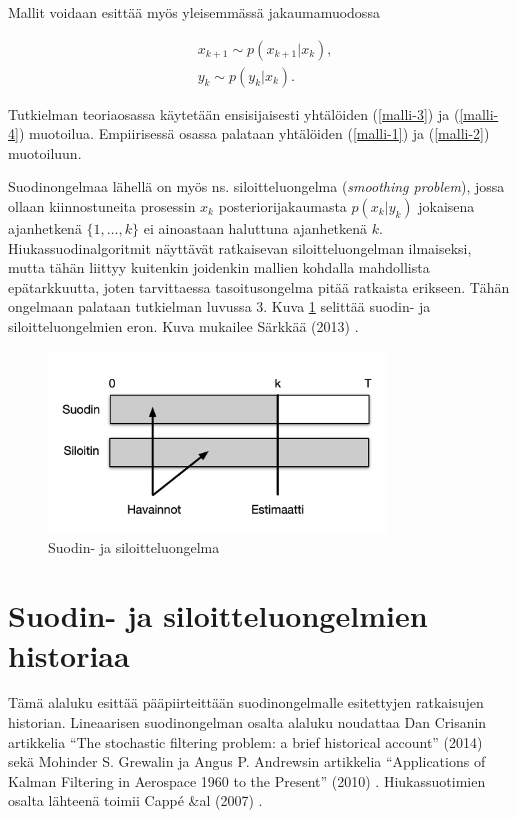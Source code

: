 \documentclass[
  12pt,
  a4paper, twoside]{book}
\begin{document}
Mallit voidaan esittää myös yleisemmässä jakaumamuodossa

\begin{align}
&\label{malli-3} x_{k+1} \sim p(x_{k+1}|x_k),\\
&\label{malli-4} y_{k} \sim p(y_k|x_k).
\end{align}

Tutkielman teoriaosassa käytetään ensisijaisesti yhtälöiden (\ref{malli-3}) ja (\ref{malli-4}) muotoilua. Empiirisessä osassa palataan yhtälöiden (\ref{malli-1}) ja (\ref{malli-2}) muotoiluun.

Suodinongelmaa lähellä on myös ns. siloitteluongelma (\emph{smoothing problem}), jossa ollaan kiinnostuneita prosessin \(x_k\) posteriorijakaumasta \(p(x_k|y_k)\) jokaisena ajanhetkenä \(\{1,\ldots,k\}\) ei ainoastaan haluttuna ajanhetkenä \(k\). Hiukassuodinalgoritmit näyttävät ratkaisevan siloitteluongelman ilmaiseksi, mutta tähän liittyy kuitenkin joidenkin mallien kohdalla mahdollista epätarkkuutta, joten tarvittaessa tasoitusongelma pitää ratkaista erikseen. Tähän ongelmaan palataan tutkielman luvussa 3. Kuva \ref{fig:suodin_vs_siloitin} selittää suodin- ja siloitteluongelmien eron. Kuva mukailee Särkkää (2013) \citep{sarkka-2013}.

\begin{figure}[H]
\centering
\includegraphics[width=9cm]{suodin_vs_siloitin_cropped}
\caption{Suodin- ja siloitteluongelma}
\label{fig:suodin_vs_siloitin}
\end{figure}

\section{Suodin- ja siloitteluongelmien historiaa}

Tämä alaluku esittää pääpiirteittään suodinongelmalle esitettyjen ratkaisujen historian. Lineaarisen suodinongelman osalta alaluku noudattaa Dan Crisanin artikkelia ``The stochastic filtering problem: a brief historical account'' (2014) \citep{crisan-2014} sekä Mohinder S. Grewalin ja Angus P. Andrewsin artikkelia ``Applications of Kalman Filtering in Aerospace 1960 to the Present'' (2010) \citep{Grewal-2010}. Hiukassuotimien osalta lähteenä toimii Cappé \&al (2007) \citep{cappe-2007}.
\end{document}
